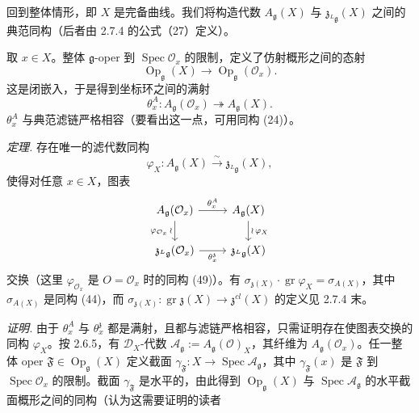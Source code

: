 
 回到整体情形，即 $X$ 是完备曲线。我们将构造代数 $A_{\mathfrak{g}}(X)$ 与 $\mathfrak{z}_{{}^{L}\mathfrak{g}}(X)$ 之间的典范同构（后者由 2.7.4 的公式（27）定义）。


取 $x\in X$。整体 $\mathfrak{g}$-oper 到 $\operatorname{Spec}\mathcal{O}_{x}$ 的限制，定义了仿射概形之间的态射
\[
  \operatorname{Op}_{\mathfrak{g}}(X)\longrightarrow\operatorname{Op}_{\mathfrak{g}}(\mathcal{O}_{x}).
\]
这是闭嵌入，于是得到坐标环之间的满射
\begin{equation}\tag{50}
  \theta_{x}^{A} : A_{\mathfrak{g}}(\mathcal{O}_{x})\twoheadrightarrow A_{\mathfrak{g}}(X).
\end{equation}
$\theta_{x}^{A}$ 与典范滤链严格相容（要看出这一点，可用同构 (24)）。

 \emph{定理.} 存在唯一的滤代数同构
\begin{equation}\tag{51}
  \varphi_{X} : A_{\mathfrak{g}}(X)\xrightarrow{\ \sim\ }\mathfrak{z}_{{}^{L}\mathfrak{g}}(X),
\end{equation}
使得对任意 $x\in X$，图表
\[
\begin{tikzcd}
  A_{\mathfrak{g}}(\mathcal{O}_{x}) \arrow[r, "\theta_{x}^{A}"] \arrow[d, "\varphi_{\mathcal{O}_{x}}\,\wr"']
    & A_{\mathfrak{g}}(X) \arrow[d, "\wr\,\varphi_{X}"] \\
  \mathfrak{z}_{{}^{L}\mathfrak{g}}(\mathcal{O}_{x}) \arrow[r, "\theta_{x}^{\mathfrak{z}}"']
    & \mathfrak{z}_{{}^{L}\mathfrak{g}}(X)
\end{tikzcd}
\]
交换（这里 $\varphi_{\mathcal{O}_{x}}$ 是 $O=\mathcal{O}_{x}$ 时的同构 (49)）。有 $\sigma_{\mathfrak{z}(X)}\cdot\operatorname{gr}\varphi_{X}=\sigma_{A(X)}$，其中 $\sigma_{A(X)}$ 是同构 (44)，而 $\sigma_{\mathfrak{z}(X)}:\operatorname{gr}\mathfrak{z}(X)\to\mathfrak{z}^{cl}(X)$ 的定义见 2.7.4 末。

\emph{证明.} 由于 $\theta_{x}^{A}$ 与 $\theta_{x}^{\mathfrak{z}}$ 都是满射，且都与滤链严格相容，只需证明存在使图表交换的同构 $\varphi_{X}$。按 2.6.5，有 $\mathcal{D}_{X}$-代数 $\mathcal{A}_{\mathfrak{g}}:=A_{\mathfrak{g}}(\mathcal{O})_{X}$，其纤维为 $A_{\mathfrak{g}}(\mathcal{O}_{x})$。任一整体 oper $\mathfrak{F}\in\operatorname{Op}_{\mathfrak{g}}(X)$ 定义截面 $\gamma_{\mathfrak{F}}:X\to\operatorname{Spec}\mathcal{A}_{\mathfrak{g}}$，其中 $\gamma_{\mathfrak{F}}(x)$ 是 $\mathfrak{F}$ 到 $\operatorname{Spec}\mathcal{O}_{x}$ 的限制。截面 $\gamma_{\mathfrak{F}}$ 是水平的，由此得到 $\operatorname{Op}_{\mathfrak{g}}(X)$ 与 $\operatorname{Spec}\mathcal{A}_{\mathfrak{g}}$ 的水平截面概形之间的同构（认为这需要证明的读者

